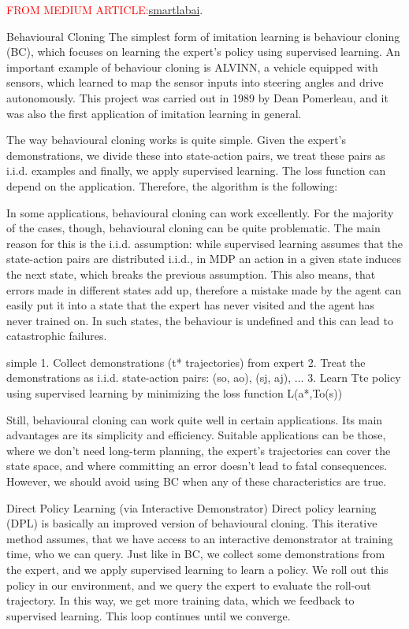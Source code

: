 \documentclass{article}
\begin{document}
\textcolor{red}{FROM MEDIUM ARTICLE:}\href{https://smartlabai.medium.com/a-brief-overview-of-imitation-learning-8a8a75c44a9c}{smartlabai}.

Behavioural Cloning
The simplest form of imitation learning is behaviour cloning (BC), which focuses on learning the expert’s policy using supervised learning. An important example of behaviour cloning is ALVINN, a vehicle equipped with sensors, which learned to map the sensor inputs into steering angles and drive autonomously. This project was carried out in 1989 by Dean Pomerleau, and it was also the first application of imitation learning in general.

The way behavioural cloning works is quite simple. Given the expert’s demonstrations, we divide these into state-action pairs, we treat these pairs as i.i.d. examples and finally, we apply supervised learning. The loss function can depend on the application. Therefore, the algorithm is the following:

In some applications, behavioural cloning can work excellently. For the majority of the cases, though, behavioural cloning can be quite problematic. The main reason for this is the i.i.d. assumption: while supervised learning assumes that the state-action pairs are distributed i.i.d., in MDP an action in a given state induces the next state, which breaks the previous assumption. This also means, that errors made in different states add up, therefore a mistake made by the agent can easily put it into a state that the expert has never visited and the agent has never trained on. In such states, the behaviour is undefined and this can lead to catastrophic failures.

simple
1. Collect demonstrations (t* trajectories) from expert
2. Treat the demonstrations as i.i.d. state-action pairs: (so, ao), (sj, aj), ...
3. Learn Tte policy using supervised learning by minimizing the loss function
L(a*,To(s))

Still, behavioural cloning can work quite well in certain applications. Its main advantages are its simplicity and efficiency. Suitable applications can be those, where we don’t need long-term planning, the expert’s trajectories can cover the state space, and where committing an error doesn’t lead to fatal consequences. However, we should avoid using BC when any of these characteristics are true.

Direct Policy Learning (via Interactive Demonstrator)
Direct policy learning (DPL) is basically an improved version of behavioural cloning. This iterative method assumes, that we have access to an interactive demonstrator at training time, who we can query. Just like in BC, we collect some demonstrations from the expert, and we apply supervised learning to learn a policy. We roll out this policy in our environment, and we query the expert to evaluate the roll-out trajectory. In this way, we get more training data, which we feedback to supervised learning. This loop continues until we converge.
\end{document}
